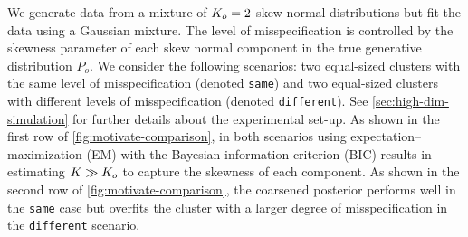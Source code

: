 	We generate data from a mixture of $K_{o} = 2$ skew normal distributions but fit the data using a Gaussian mixture.
	The level of misspecification is controlled by the skewness parameter of each skew normal component in the true generative distribution $P_{o}$.
	We consider the following scenarios: two equal-sized clusters with the same level of misspecification (denoted \texttt{same})
	and two equal-sized clusters with different levels of misspecification (denoted \texttt{different}).
	See \cref{sec:high-dim-simulation} for further details about the experimental set-up.
	As shown in the first row of \cref{fig:motivate-comparison}, in both scenarios using expectation--maximization (EM)
	with the Bayesian information criterion (BIC) results in estimating $K \gg K_{o}$
	to capture the skewness of each component.
	As shown in the second row of \cref{fig:motivate-comparison},
	the coarsened posterior performs well in the \texttt{same} case but overfits the cluster with a larger degree of misspecification in the \texttt{different} scenario.


